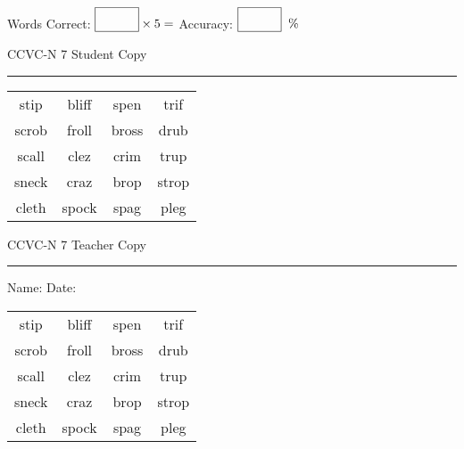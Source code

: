 \documentclass{memoir}
\begin{document}
\small

Words Correct: $\fbox{\phantom{\huge 100}} \times 5 = $ Accuracy: $\fbox{\phantom{\huge 100}}\;\; \%$ 

\vfill

\newpage


\footnotesize \noindent
CCVC-N 7 \hfill Student Copy
\smallskip
\hrule

\Large

\setlength{\tabcolsep}{14pt}
\def\arraystretch{3}

{\selectfont


\begin{vplace}[0.5]
\begin{center}
\begin{tabular}{cccc}
stip & bliff & spen & trif \\
scrob & froll & bross       & drub             \\
scall & clez & crim & trup       \\
sneck & craz        & brop   & strop \\
cleth & spock & spag          & pleg \\
\end{tabular}
\end{center}
\end{vplace}

}

\newpage

\footnotesize \noindent
CCVC-N 7 \hfill Teacher Copy
\smallskip
\hrule

\small

\vfill

\noindent
Name: \underline{\hspace{1.75in}} \hfill Date: \underline{\hspace{1in}}

\Large

{\selectfont


\begin{vplace}[0.5]
\begin{center}
\begin{tabular}{cccc}
stip & bliff & spen & trif \\
scrob & froll & bross       & drub             \\
scall & clez & crim & trup       \\
sneck & craz        & brop   & strop \\
cleth & spock & spag          & pleg \\
\end{tabular}
\end{center}
\end{vplace}



}
\end{document}
